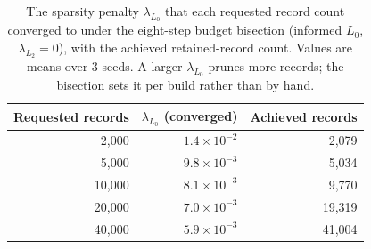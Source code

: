 \begin{table}[H]
\centering
{\tablefont
\begin{tabular}{rrr}
\toprule
Requested records & $\lambda_{L_0}$ (converged) & Achieved records \\
\midrule
2{,}000 & $1.4\times10^{-2}$ & 2{,}079 \\
5{,}000 & $9.8\times10^{-3}$ & 5{,}034 \\
10{,}000 & $8.1\times10^{-3}$ & 9{,}770 \\
20{,}000 & $7.0\times10^{-3}$ & 19{,}319 \\
40{,}000 & $5.9\times10^{-3}$ & 41{,}004 \\
\bottomrule
\end{tabular}
}
\caption{The sparsity penalty $\lambda_{L_0}$ that each requested record count converged to under the
eight-step budget bisection (informed $L_0$, $\lambda_{L_2}=0$), with the achieved retained-record
count. Values are means over 3 seeds. A larger $\lambda_{L_0}$ prunes more records; the
bisection sets it per build rather than by hand.}
\label{tab:presets}
\end{table}
